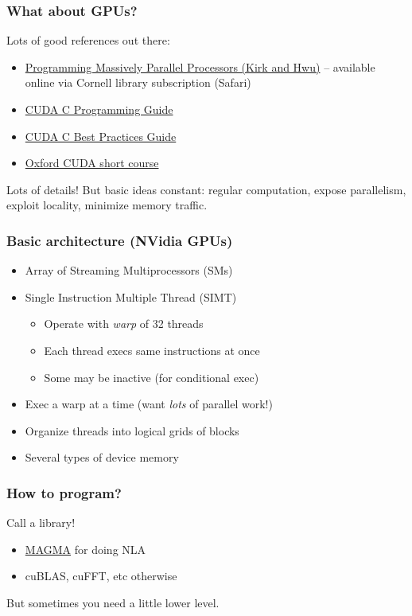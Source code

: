 \documentclass{beamer}
\begin{document}
\begin{frame}
  \frametitle{What about GPUs?}

  Lots of good references out there:
  \begin{itemize}
  \item
    \href{http://proquest.safaribooksonline.com/book/software-engineering-and-development/9780124159921}{Programming
      Massively Parallel Processors (Kirk and Hwu)} -- available
    online via Cornell library subscription (Safari)
  \item
    \href{http://docs.nvidia.com/cuda/pdf/CUDA_C_Programming_Guide.pdf}{CUDA
      C Programming Guide}
  \item
    \href{http://docs.nvidia.com/cuda/pdf/CUDA_C_Best_Practices_Guide.pdf}{CUDA
      C Best Practices Guide}
  \item
    \href{http://people.maths.ox.ac.uk/gilesm/cuda/}{Oxford CUDA short course}
  \end{itemize}
  Lots of details!  But basic ideas constant: regular computation,
  expose parallelism, exploit locality, minimize memory traffic.
  
\end{frame}


\begin{frame}
  \frametitle{Basic architecture (NVidia GPUs)}

  \begin{itemize}
  \item Array of Streaming Multiprocessors (SMs)
  \item Single Instruction Multiple Thread (SIMT)
    \begin{itemize}
    \item Operate with {\em warp} of 32 threads
    \item Each thread execs same instructions at once
    \item Some may be inactive (for conditional exec)
    \end{itemize}
  \item Exec a warp at a time (want {\em lots} of parallel work!)
  \item Organize threads into logical grids of blocks
  \item Several types of device memory
  \end{itemize}
\end{frame}


\begin{frame}
  \frametitle{How to program?}

  Call a library!
  \begin{itemize}
  \item \href{http://icl.cs.utk.edu/magma/}{MAGMA} for doing NLA
  \item cuBLAS, cuFFT, etc otherwise
  \end{itemize}
  But sometimes you need a little lower level.
\end{frame}
\end{document}
